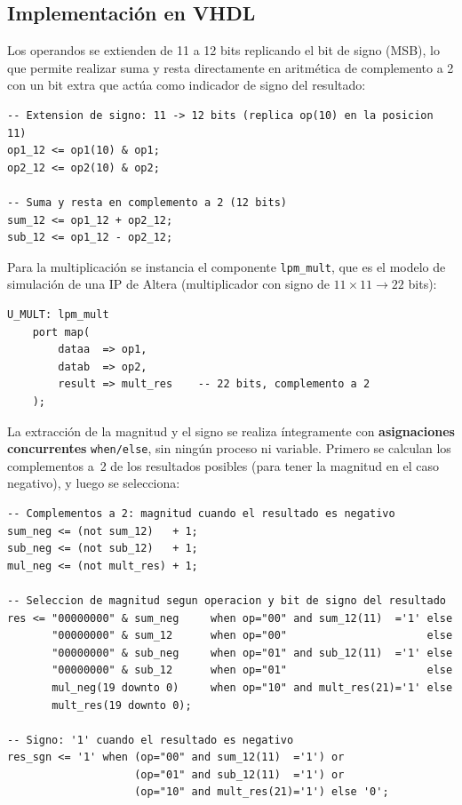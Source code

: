 \documentclass[memoria_final]{subfiles}
\begin{document}
\subsection{Implementación en VHDL}

Los operandos se extienden de 11 a 12 bits replicando el bit de signo (MSB),
lo que permite realizar suma y resta directamente en aritmética de complemento
a 2 con un bit extra que actúa como indicador de signo del resultado:

\begin{lstlisting}[caption={Extensión de signo y operaciones aritméticas en \texttt{alu.vhd}}]
-- Extension de signo: 11 -> 12 bits (replica op(10) en la posicion 11)
op1_12 <= op1(10) & op1;
op2_12 <= op2(10) & op2;

-- Suma y resta en complemento a 2 (12 bits)
sum_12 <= op1_12 + op2_12;
sub_12 <= op1_12 - op2_12;
\end{lstlisting}

Para la multiplicación se instancia el componente \texttt{lpm\_mult}, que es
el modelo de simulación de una IP de Altera (multiplicador con signo de
$11 \times 11 \to 22$ bits):

\begin{lstlisting}[caption={Instanciación del multiplicador IP en \texttt{alu.vhd}}]
U_MULT: lpm_mult
    port map(
        dataa  => op1,
        datab  => op2,
        result => mult_res    -- 22 bits, complemento a 2
    );
\end{lstlisting}

La extracción de la magnitud y el signo se realiza íntegramente con
\textbf{asignaciones concurrentes} \texttt{when/else}, sin ningún proceso ni
variable. Primero se calculan los complementos a~2 de los resultados posibles
(para tener la magnitud en el caso negativo), y luego se selecciona:

\begin{lstlisting}[caption={Extracción de magnitud sin variables ni proceso en \texttt{alu.vhd}}]
-- Complementos a 2: magnitud cuando el resultado es negativo
sum_neg <= (not sum_12)   + 1;
sub_neg <= (not sub_12)   + 1;
mul_neg <= (not mult_res) + 1;

-- Seleccion de magnitud segun operacion y bit de signo del resultado
res <= "00000000" & sum_neg     when op="00" and sum_12(11)  ='1' else
       "00000000" & sum_12      when op="00"                      else
       "00000000" & sub_neg     when op="01" and sub_12(11)  ='1' else
       "00000000" & sub_12      when op="01"                      else
       mul_neg(19 downto 0)     when op="10" and mult_res(21)='1' else
       mult_res(19 downto 0);

-- Signo: '1' cuando el resultado es negativo
res_sgn <= '1' when (op="00" and sum_12(11)  ='1') or
                    (op="01" and sub_12(11)  ='1') or
                    (op="10" and mult_res(21)='1') else '0';
\end{lstlisting}
\end{document}

